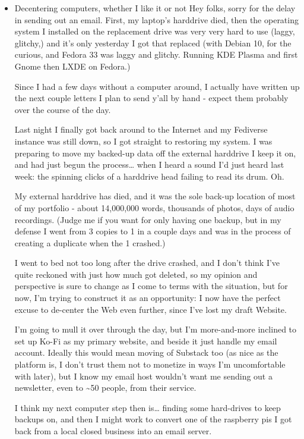\documentclass[11pt]{article}
\begin{document}
\begin{itemize}
\item Decentering computers, whether I like it or not
\label{sec:orgfad98f5}
Hey folks, sorry for the delay in sending out an email. First, my laptop’s harddrive died, then the operating system I installed on the replacement drive was very very hard to use (laggy, glitchy,) and it’s only yesterday I got that replaced (with Debian 10, for the curious, and Fedora 33 was laggy and glitchy. Running KDE Plasma and first Gnome then LXDE on Fedora.)

Since I had a few days without a computer around, I actually have written up the next couple letters I plan to send y’all by hand - expect them probably over the course of the day.

Last night I finally got back around to the Internet and my Fediverse instance was still down, so I got straight to restoring my system. I was preparing to move my backed-up data off the external harddrive I keep it on, and had just begun the process… when I heard a sound I’d just heard last week: the spinning clicks of a harddrive head failing to read its drum. Oh.

My external harddrive has died, and it was the sole back-up location of most of my portfolio - about 14,000,000 words, thousands of photos, days of audio recordings. (Judge me if you want for only having one backup, but in my defense I went from 3 copies to 1 in a couple days and was in the process of creating a duplicate when the 1 crashed.)

I went to bed not too long after the drive crashed, and I don’t think I’ve quite reckoned with just how much got deleted, so my opinion and perspective is sure to change as I come to terms with the situation, but for now, I’m trying to construct it as an opportunity: I now have the perfect excuse to de-center the Web even further, since I’ve lost my draft Website.

I’m going to mull it over through the day, but I’m more-and-more inclined to set up Ko-Fi as my primary website, and beside it just handle my email account. Ideally this would mean moving of Substack too (as nice as the platform is, I don’t trust them not to monetize in ways I’m uncomfortable with later), but I know my email host wouldn’t want me sending out a newsletter, even to \textasciitilde{}50 people, from their service.

I think my next computer step then is… finding some hard-drives to keep backups on, and then I might work to convert one of the raspberry pis I got back from a local closed business into an email server.


\end{itemize}
\end{document}
